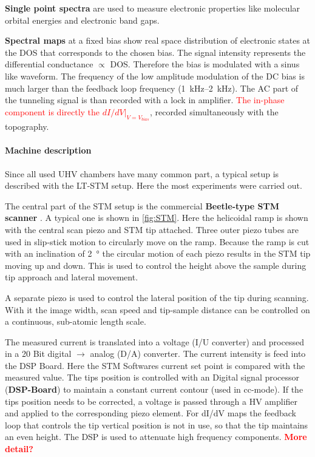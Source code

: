 	\textbf{Single point spectra} are used to measure electronic properties like molecular orbital energies and electronic band gaps.
	
	\textbf{Spectral maps} at a fixed bias show real space distribution of electronic states at the DOS that corresponds to the chosen bias. The signal intensity represents the differential conductance $\propto$ DOS.
	Therefore the bias is modulated with a sinus like waveform. The frequency of the low amplitude modulation of the DC bias is much larger than the feedback loop frequency (\SIrange{1}{2}{\kilo \hertz}). The AC part of the tunneling signal is than recorded with a lock in amplifier. \textcolor{red}{The in-phase component is directly the $dI/dV|_{V=V_{bias}}$}, recorded simultaneously with the topography.


\paragraph{Machine description}
Since all used UHV chambers have many common part, a typical setup is described with the LT-STM setup. Here the most experiments were carried out.

The central part of the STM setup is the commercial \textbf{Beetle-type STM scanner} \cite{zoephel_aufbau_2000}. A typical one is shown in \ref{fig:STM}. Here the helicoidal ramp is shown with the central scan piezo and STM tip attached. Three outer piezo tubes are used in slip-stick motion to circularly move on the ramp. Because the ramp is cut with an inclination of \SI{2}{\degree} the circular motion of each piezo results in the STM tip moving up and down. This is used to control the height above the sample during tip approach and lateral movement.

A separate piezo is used to control the lateral position of the tip during scanning. With it the image width, scan speed and tip-sample distance can be controlled on a continuous, sub-atomic length scale.

The measured current is translated into a voltage (I/U converter) and processed in a 20 Bit digital $\rightarrow$ analog (D/A) converter. The current intensity is feed into the DSP Board. Here the STM Softwares current set point is compared with the measured value. The tips position is controlled with an Digital signal processor (\textbf{DSP-Board}) to maintain a constant current contour (used in cc-mode). If the tips position needs to be corrected, a voltage is passed through a HV amplifier and applied to the corresponding piezo element. For dI/dV maps the feedback loop that controls the tip vertical position is not in use, so that the tip maintains an even height. The DSP is used to attenuate high frequency components. \textcolor{red}{\textbf{ More detail?}}

